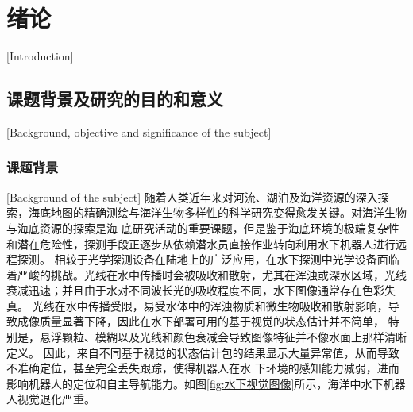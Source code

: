 
\chapter{绪\hspace{1em}论}[Introduction]

\section{课题背景及研究的目的和意义}[Background, objective and significance of the subject]
\subsection{课题背景}[Background of the subject]
随着人类近年来对河流、湖泊及海洋资源的深入探索，海底地图的精确测绘与海洋生物多样性的科学研究变得愈发关键。对海洋生物与海底资源的探索是海
底研究活动的重要课题，但是鉴于海底环境的极端复杂性和潜在危险性，探测手段正逐步从依赖潜水员直接作业转向利用水下机器人进行远程探测。
相较于光学探测设备在陆地上的广泛应用，在水下探测中光学设备面临着严峻的挑战。光线在水中传播时会被吸收和散射，尤其在浑浊或深水区域，光线
衰减迅速；并且由于水对不同波长光的吸收程度不同，水下图像通常存在色彩失真。
光线在水中传播受限，易受水体中的浑浊物质和微生物吸收和散射影响，导致成像质量显著下降，因此在水下部署可用的基于视觉的状态估计并不简单，
特别是，悬浮颗粒、模糊以及光线和颜色衰减会导致图像特征并不像水面上那样清晰定义。
因此，来自不同基于视觉的状态估计包的结果显示大量异常值，从而导致不准确定位，甚至完全丢失跟踪\cite{rahman2019svin2}，使得机器人在水
下环境的感知能力减弱，进而影响机器人的定位和自主导航能力。如图\ref{fig:水下视觉图像}所示，海洋中水下机器人视觉退化严重。

